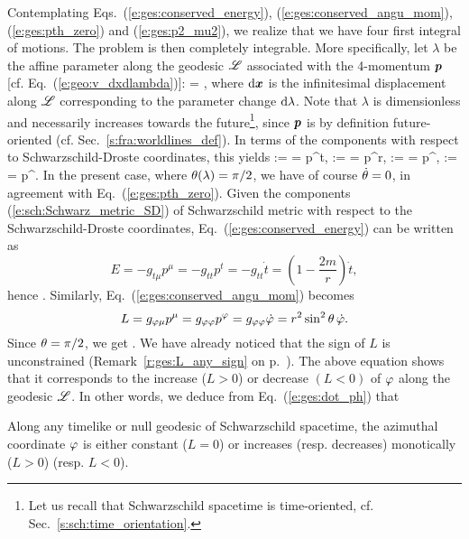 Contemplating Eqs.~(\ref{e:ges:conserved_energy}), (\ref{e:ges:conserved_angu_mom}),
(\ref{e:ges:pth_zero}) and (\ref{e:ges:p2_mu2}), we realize that we have
four first integral of motions. The problem is then completely integrable.
More specifically, let $\lambda$ be the affine parameter along the geodesic
$\mathscr{L}$ associated with the 4-momentum $\bm{p}$ [cf. Eq.~(\ref{e:geo:v_dxdlambda})]:
\be \label{e:ges:def_lambda}
     =  ,
\ee
where  $\mathrm{d}\bm{x}$ is the infinitesimal displacement along $\mathscr{L}$ corresponding
to the parameter change $\mathrm{d}\lambda$. Note that $\lambda$ is dimensionless
and necessarily increases towards the future\footnote{Let us recall
that Schwarzschild spacetime is time-oriented, cf. Sec.~\ref{s:sch:time_orientation}.},
since $\bm{p}$ is by definition future-oriented (cf. Sec.~\ref{s:fra:worldlines_def}).
In terms of the components with respect to Schwarzschild-Droste coordinates,
this yields
\be \label{e:ges:comp_4_momentum}
     :=  = p^t,\qquad
     :=  = p^r,\qquad
    \dot{\th} := \frac{\D \th}{\D\lambda} = p^\th,\qquad
    \dot{\ph} := \frac{\D \ph}{\D\lambda} = p^\ph .
\ee
In the present case, where $\theta(\lambda)=\pi/2$, we have of course $\dot{\theta}=0$,
in agreement with Eq.~(\ref{e:ges:pth_zero}).
Given the components (\ref{e:sch:Schwarz_metric_SD}) of Schwarzschild metric
with respect to the Schwarzschild-Droste coordinates,
Eq.~(\ref{e:ges:conserved_energy}) can be written as
\[
    E = - g_{t\mu} p^\mu = - g_{tt} p^t = - g_{tt} \dot{t}
    = \left(1 - \frac{2m}{r} \right) \dot{t} ,
\]
hence
\be \label{e:ges:dot_t}
    .
\ee
Similarly, Eq.~(\ref{e:ges:conserved_angu_mom}) becomes
\[
    L = g_{\varphi\mu} p^\mu = g_{\varphi\varphi} p^\varphi  = g_{\varphi\varphi} \dot{\varphi}
        = r^2 \sin^2\theta \, \dot{\varphi} .
\]
Since $\theta=\pi/2$, we get
\be \label{e:ges:dot_ph}
     .
\ee
We have already noticed that the sign of $L$ is unconstrained (Remark~\ref{r:ges:L_any_sign} on p.~\pageref{r:ges:L_any_sign}). The above equation
shows that it corresponds to the increase ($L>0$) or decrease $(L<0)$
of $\varphi$ along the geodesic $\mathscr{L}$. In other words, we deduce from Eq.~(\ref{e:ges:dot_ph})
that
\begin{greybox}
Along any timelike or null geodesic of Schwarzschild spacetime,
the azimuthal coordinate $\varphi$ is either constant ($L=0$)
or increases (resp. decreases) monotically ($L>0$) (resp. $L<0$).
\end{greybox}

